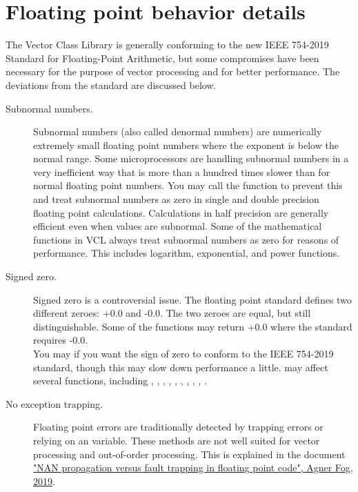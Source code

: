 \documentclass[vcl_manual.tex]{subfiles}
\begin{document}
\section{Floating point behavior details}
\label{FloatingPointBehavior}

The Vector Class Library is generally conforming to the new IEEE 754-2019 Standard for Floating-Point Arithmetic, but some compromises have been necessary for the purpose of vector processing and for better performance. The deviations from the standard are discussed below.

\begin{description}

\item[Subnormal numbers.]
Subnormal numbers (also called denormal numbers) are numerically extremely small floating point numbers where the exponent is below the normal range. Some microprocessors are handling subnormal numbers in a very inefficient way that is more than a hundred times slower than for normal floating point numbers. You may call the function  to prevent this and treat subnormal numbers as zero in single and double precision floating point calculations. Calculations in half precision are generally efficient even when values are subnormal. 
Some of the mathematical functions in VCL always treat subnormal numbers as zero for reasons of performance. This includes logarithm, exponential, and power functions.

\item[Signed zero.]
Signed zero is a controversial issue. The floating point standard defines two different zeroes: +0.0 and -0.0.
The two zeroes are equal, but still distinguishable. Some of the functions may return +0.0 where the standard requires -0.0.\\
You may {}  {} if you want the sign of zero to conform to the
IEEE 754-2019 standard, though this may slow down performance a little.
 may affect several functions, including
, , , , 
, , , , , .

\item[No exception trapping.] \label{NoExceptionTrapping}
Floating point errors are traditionally detected by trapping errors or relying on an  variable. These methods are not well suited for vector processing and out-of-order processing. This is explained in the document \href{https://www.agner.org/optimize/nan_propagation.pdf}{"NAN propagation versus fault trapping in floating point code", Agner Fog, 2019}.


\end{description}
\end{document}
